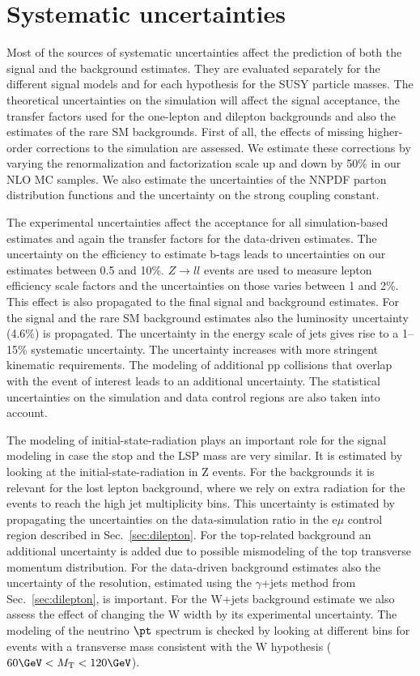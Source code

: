 \section{Systematic uncertainties}	
\label{sec:syst}

Most of the sources of systematic uncertainties affect the prediction of both the signal and the background estimates.  They are evaluated separately for the different signal models
and for each hypothesis for the SUSY particle masses. The theoretical uncertainties on the simulation will affect the signal acceptance, the transfer factors used for the one-lepton and dilepton backgrounds and also the estimates of the rare SM backgrounds.  First of all, the effects of missing higher-order corrections to the simulation are assessed.  We estimate these corrections by varying the renormalization and factorization scale up and down by 50\% in our NLO MC samples.  We also estimate the uncertainties of the NNPDF parton distribution functions and the uncertainty on the strong coupling constant.

The experimental uncertainties affect the acceptance for all simulation-based estimates and again the transfer factors for the data-driven estimates.  The uncertainty on the efficiency to estimate b-tags leads to uncertainties on our estimates between 0.5 and 10\%.  $Z\rightarrow ll$ events are used to measure lepton efficiency scale factors and the uncertainties on those varies between 1 and 2\%.  This effect is also propagated to the final signal and background estimates.  For the signal and the rare SM background estimates also the luminosity uncertainty (4.6\%) is propagated.  The uncertainty in the energy scale of  jets gives rise to a 1–15\% systematic uncertainty.  The uncertainty increases with more stringent kinematic requirements.  The modeling of additional pp collisions that overlap with the event of interest leads to an additional uncertainty. The statistical uncertainties on the simulation and data control regions are also taken into account.  

The modeling of initial-state-radiation plays an important role for the signal modeling in case the stop and the LSP mass are very similar.  It is estimated by looking at the initial-state-radiation in Z events.  For the backgrounds it is relevant for the lost lepton background, where we rely on extra radiation for the events to reach the high jet multiplicity bins. This uncertainty is estimated by propagating the uncertainties on the data-simulation ratio in the e$\mu$ control region described in Sec.~\ref{sec:dilepton}.  For the top-related background an additional uncertainty is added due to possible mismodeling of the top transverse momentum distribution.  For the data-driven background estimates also the uncertainty of the \MET resolution, estimated using the $\gamma$+jets method from Sec.~\ref{sec:dilepton}, is important.  For the W+jets background estimate we also assess the effect of changing the W width by its experimental uncertainty.  The modeling of the neutrino $\pt$ spectrum is checked by looking at different \MET bins for events with a transverse mass consistent with the W hypothesis ($60 \GeV<\MT<120 \GeV$). 

